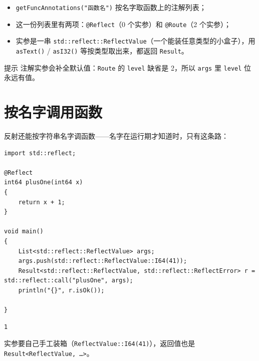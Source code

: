 \begin{itemize}

\item \texttt{get\allowbreak{}Func\allowbreak{}Annotations(\allowbreak{}"函数名")\allowbreak{}} 按名字取函数上的注解列表；

\item 这一份列表里有两项：\texttt{@Reflect}（0 个实参）和 \texttt{@Route}（2 个实参）；

\item 实参是一串 \texttt{std:\allowbreak{}:\allowbreak{}reflect:\allowbreak{}:\allowbreak{}Reflect\allowbreak{}Value}（一个能装任意类型的小盒子），用 \texttt{as\allowbreak{}Text(\allowbreak{})\allowbreak{}} / \texttt{as\allowbreak{}I32(\allowbreak{})\allowbreak{}} 等按类型取出来，都返回 \texttt{Result}。

\end{itemize}

\begin{tip}{提示}
注解实参会补全默认值：\texttt{Route} 的 \texttt{level} 缺省是 2，所以 \texttt{args} 里 \texttt{level} 位永远有值。
\end{tip}

\section{按名字调用函数}

反射还能按字符串名字调函数——名字在运行期才知道时，只有这条路：

\par
\medskip
\begin{lstlisting}[style=chali]
import std::reflect;

@Reflect
int64 plusOne(int64 x)
{
    return x + 1;
}

void main()
{
    List<std::reflect::ReflectValue> args;
    args.push(std::reflect::ReflectValue::I64(41));
    Result<std::reflect::ReflectValue, std::reflect::ReflectError> r = std::reflect::call("plusOne", args);
    println("{}", r.isOk());

}
\end{lstlisting}
\par
\medskip

\par
\medskip
\begin{lstlisting}[style=out]
1
\end{lstlisting}
\par
\medskip

实参要自己手工装箱（\texttt{Reflect\allowbreak{}Value:\allowbreak{}:\allowbreak{}I64(\allowbreak{}41)\allowbreak{}}），返回值也是 \texttt{Result<\allowbreak{}Reflect\allowbreak{}Value,\allowbreak{} …>\allowbreak{}}。

